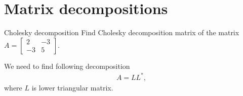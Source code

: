 \section{Matrix decompositions}

\begin{problem}{Cholesky decomposition}
    Find Cholesky decomposition matrix of the matrix 
    $A = \begin{bmatrix}
            2 & -3 \\
            -3 & 5
        \end{bmatrix}$.
\begin{solution}
    We need to find following decomposition
    \begin{eqnarray}      
        A=LL^*,\label{1}
    \end{eqnarray}
    where $L$ is lower triangular matrix. 
    

\end{solution}
\end{problem}
